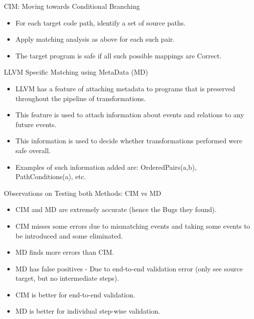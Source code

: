 \documentclass[xcolor=dvipsnames, notes]{beamer}
\begin{document}
    \begin{frame}{CIM: Moving towards Conditional Branching}

        \begin{itemize}
            \item For each target code path, identify a set of source paths.
            \item Apply matching analysis as above for each such pair.
            \item The target program is safe if all such possible mappings are Correct. 
        \end{itemize}
    
    \end{frame}
    \begin{frame}{LLVM Specific Matching using MetaData (MD)}
       
        \begin{itemize}
            \item LLVM has a feature of attaching metadata to programs that is preserved throughout the pipeline of transformations.
            \item This feature is used to attach information about events and relations to any future events.
            \item This information is used to decide whether transformations performed were safe overall.
            \item Examples of such information added are: OrderedPairs(a,b), PathConditions(a), etc.
        \end{itemize}
        
    \end{frame}

    \begin{frame}{Observations on Testing both Methods: CIM vs MD}

        \begin{itemize}
            \item CIM and MD are extremely accurate (hence the Bugs they found).
            \item CIM misses some errors due to mismatching events and taking some events to be introduced and some eliminated.
            \item MD finds more errors than CIM.
            \item MD has false positives - Due to end-to-end validation error (only see source target, but no intermediate steps).
            \item CIM is better for end-to-end validation.
            \item MD is better for individual step-wise validation.
        \end{itemize}
    \end{frame}
\end{document}
